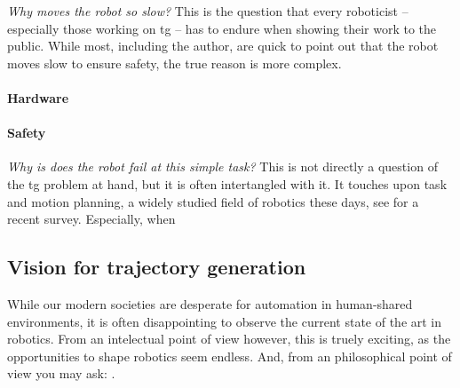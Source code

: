 \textit{Why moves the robot so slow?} This is the question that every roboticist
-- especially those working on \ac{tg} --
has to endure when showing their work to the public. While most, including the
author, are quick to point out that the robot moves slow to ensure safety, the
true reason is more complex.

\paragraph{Hardware}

\paragraph{Safety}

\textit{Why is does the robot fail at this simple task?} This is not directly a
question of the \ac{tg} problem at hand, but it is often intertangled with it.
It touches upon task and motion planning, a widely studied field of robotics
these days, see \cite{garrett2021integrated} for a recent survey. Especially,
when 

\subsection{Vision for trajectory generation}
\label{sec:discussion_vision}

While our modern societies are desperate for automation in human-shared
environments, it is often disappointing to observe the current state of the art
in robotics. From an intelectual point of view however, this is truely exciting,
as the opportunities to shape robotics seem endless. And, from an philosophical
point of view you may ask: .
